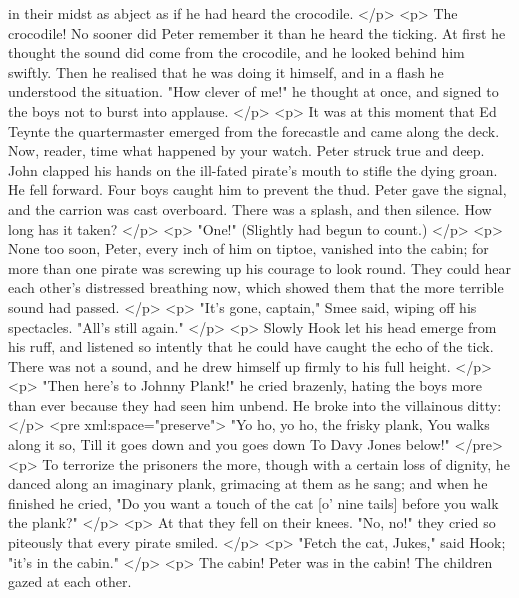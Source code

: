       in their midst as abject as if he had heard the crocodile.
    </p>
    <p>
      The crocodile! No sooner did Peter remember it than he heard the ticking.
      At first he thought the sound did come from the crocodile, and he looked
      behind him swiftly. Then he realised that he was doing it himself, and in
      a flash he understood the situation. "How clever of me!" he thought at
      once, and signed to the boys not to burst into applause.
    </p>
    <p>
      It was at this moment that Ed Teynte the quartermaster emerged from the
      forecastle and came along the deck. Now, reader, time what happened by
      your watch. Peter struck true and deep. John clapped his hands on the
      ill-fated pirate's mouth to stifle the dying groan. He fell forward. Four
      boys caught him to prevent the thud. Peter gave the signal, and the
      carrion was cast overboard. There was a splash, and then silence. How long
      has it taken?
    </p>
    <p>
      "One!" (Slightly had begun to count.)
    </p>
    <p>
      None too soon, Peter, every inch of him on tiptoe, vanished into the
      cabin; for more than one pirate was screwing up his courage to look round.
      They could hear each other's distressed breathing now, which showed them
      that the more terrible sound had passed.
    </p>
    <p>
      "It's gone, captain," Smee said, wiping off his spectacles. "All's still
      again."
    </p>
    <p>
      Slowly Hook let his head emerge from his ruff, and listened so intently
      that he could have caught the echo of the tick. There was not a sound, and
      he drew himself up firmly to his full height.
    </p>
    <p>
      "Then here's to Johnny Plank!" he cried brazenly, hating the boys more
      than ever because they had seen him unbend. He broke into the villainous
      ditty:
    </p>
<pre xml:space="preserve">
     "Yo ho, yo ho, the frisky plank,
     You walks along it so,
     Till it goes down and you goes down
     To Davy Jones below!"
</pre>
    <p>
      To terrorize the prisoners the more, though with a certain loss of
      dignity, he danced along an imaginary plank, grimacing at them as he sang;
      and when he finished he cried, "Do you want a touch of the cat [o' nine
      tails] before you walk the plank?"
    </p>
    <p>
      At that they fell on their knees. "No, no!" they cried so piteously that
      every pirate smiled.
    </p>
    <p>
      "Fetch the cat, Jukes," said Hook; "it's in the cabin."
    </p>
    <p>
      The cabin! Peter was in the cabin! The children gazed at each other.
